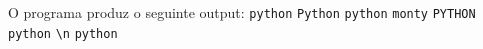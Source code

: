 \documentclass[12pt,varwidth=16cm,border=1pt]{standalone}
\begin{document}
O programa produz o seguinte output: 
\newline
\verb+python+ \newline
\verb+Python+ \newline
\verb+python+ \verb+monty+ \newline
\verb+PYTHON+ \newline
\verb+python+ \newline
\verb+\n+     \newline
\verb+python+
\end{document}
